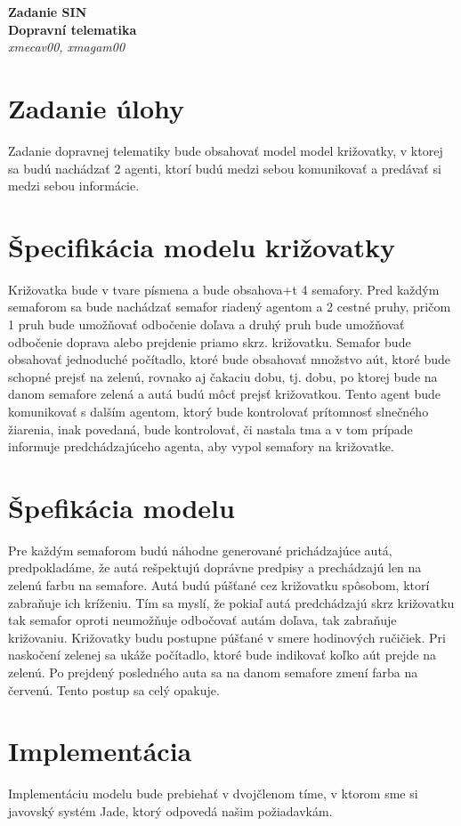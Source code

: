 \documentclass[12pt,a4paper,titlepage,final]{article}
\begin{document}
   \begin{center}
      \Large\textbf{Zadanie SIN}\\
      \Large\textbf{Dopravní telematika}\\
      \large\textit{xmecav00, xmagam00}
   \end{center}
  
\section{Zadanie úlohy}
Zadanie dopravnej telematiky bude obsahovať model model križovatky, v ktorej sa budú nachádzať 2 agenti, ktorí budú medzi sebou komunikovať a predávať si medzi sebou informácie. 

\section{Špecifikácia modelu križovatky}
Križovatka bude v tvare písmena  a bude obsahova+t 4 semafory. Pred každým semaforom sa bude nachádzať semafor riadený agentom a 2 cestné pruhy, pričom 1 pruh bude umožňovať odbočenie doľava a druhý pruh bude umožňovať odbočenie doprava alebo prejdenie priamo skrz. križovatku. Semafor bude obsahovať jednoduché počítadlo, ktoré bude obsahovať množstvo aút, ktoré bude schopné prejsť na zelenú, rovnako aj čakaciu dobu, tj. dobu, po ktorej bude na danom semafore zelená a autá budú môcť prejsť križovatkou. Tento agent bude komunikovať s dalším agentom, ktorý bude kontrolovať prítomnosť slnečného žiarenia, inak povedaná, bude kontrolovať, či nastala tma a v tom prípade informuje predchádzajúceho agenta, aby vypol semafory na križovatke. 
\section{Špefikácia modelu}
Pre každým semaforom budú náhodne generované prichádzajúce autá, predpokladáme, že autá rešpektujú doprávne predpisy a prechádzajú len na zelenú farbu na semafore. Autá budú púšťané cez križovatku spôsobom, ktorí zabraňuje ich kríženiu. Tím sa myslí, že pokiaľ autá predchádzajú skrz križovatku tak semafor oproti neumožňuje odbočovať autám doľava, tak zabraňuje križovaniu. Križovatky budu postupne púšťané v smere hodinových ručičiek. Pri naskočení zelenej sa ukáže počítadlo, ktoré bude indikovať koľko aút prejde na zelenú. Po prejdený posledného auta sa na danom semafore zmení farba na červenú. Tento postup sa celý opakuje.

\section{Implementácia}
Implementáciu modelu bude prebiehať v dvojčlenom tíme, v ktorom sme si javovský systém Jade, ktorý odpovedá našim požiadavkám.
\end{document}
